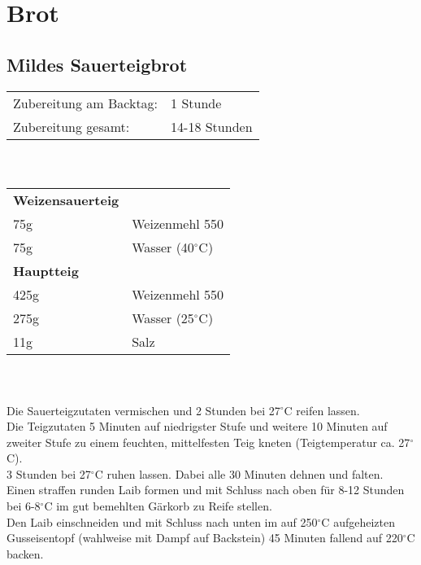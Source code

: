 

\chapter{Brot}


\section{Mildes Sauerteigbrot}
\begin{tabular}{ll}
    Zubereitung am Backtag: & 1 Stunde      \\
    Zubereitung gesamt:     & 14-18 Stunden
\end{tabular}\\

\paragraph{}
\begin{tabular}{ll}
    \textbf{Weizensauerteig} \\
    75g  & Weizenmehl 550       \\
    75g  & Wasser (40$^\circ$C) \\
    \textbf{Hauptteig} \\
    425g & Weizenmehl 550       \\
    275g & Wasser (25$^\circ$C) \\
    11g  & Salz                 \\
\end{tabular}\\

\paragraph{}
Die Sauerteigzutaten vermischen und 2 Stunden bei 27$^\circ$C reifen lassen.\\
Die Teigzutaten 5 Minuten auf niedrigster Stufe und weitere 10 Minuten auf zweiter Stufe zu einem feuchten, mittelfesten Teig kneten (Teigtemperatur ca. 27$^\circ$C).\\
3 Stunden bei 27$^\circ$C ruhen lassen. Dabei alle 30 Minuten dehnen und falten.\\
Einen straffen runden Laib formen und mit Schluss nach oben für 8-12 Stunden bei 6-8$^\circ$C im gut bemehlten Gärkorb zu Reife stellen.\\
Den Laib einschneiden und mit Schluss nach unten im auf 250$^\circ$C aufgeheizten Gusseisentopf (wahlweise mit Dampf auf Backstein) 45 Minuten fallend auf 220$^\circ$C backen.
\newpage


